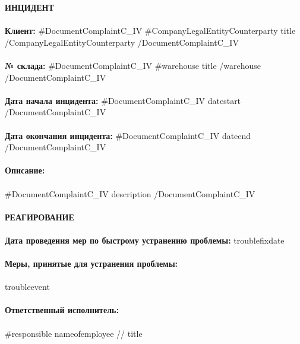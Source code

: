{{{{{{{\noindent \textbf{ИНЦИДЕНТ} \\
\vspace{1mm} \\
\textbf{Клиент:} {{#DocumentComplaintC_IV}} {{#CompanyLegalEntityCounterparty}} {{title}} {{/CompanyLegalEntityCounterparty}} {{/DocumentComplaintC_IV}}  \\
\vspace{1mm} \\
\textbf{№ склада:}  {{#DocumentComplaintC_IV}}  {{#warehouse}} {{title}} {{/warehouse}} {{/DocumentComplaintC_IV}}   \\
\vspace{1mm} \\
\textbf{Дата начала инцидента:} {{#DocumentComplaintC_IV}} {{datestart}}  {{/DocumentComplaintC_IV}}  \\
\vspace{1mm} \\
\textbf{Дата окончания инцидента:}  {{#DocumentComplaintC_IV}} {{dateend}}  {{/DocumentComplaintC_IV}}  \\
\vspace{1mm} \\
\textbf{Описание:} \\
\vspace{1mm} \\
{{#DocumentComplaintC_IV}} {{description}} {{/DocumentComplaintC_IV}}  \\
\vspace{7mm} \\
\noindent\textbf{РЕАГИРОВАНИЕ} \\
\vspace{1mm} \\
\noindent\textbf{Дата проведения мер по быстрому устранению проблемы:} {{troublefixdate}}  \\
\vspace{1mm} \\
\noindent\textbf{Меры, принятые для устранения проблемы:} \\
\vspace{1mm} \\
 {{troubleevent}} \\
 \vspace{1mm} \\
\noindent\textbf{Ответственный исполнитель:} \\
\vspace{1mm} \\
{{#responsible}}
 {{nameofemployee}} // {{title}}  \\
}}}}}}}

